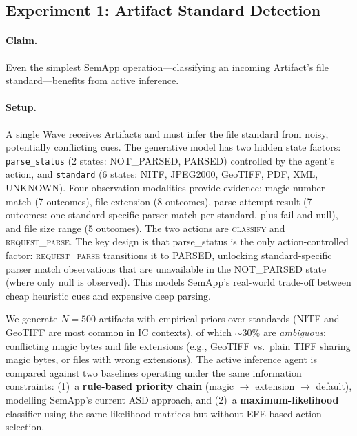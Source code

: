 \documentclass[11pt,a4paper]{article}
\theoremstyle{definition}
\begin{document}
\subsection{Experiment 1: Artifact Standard Detection}
\label{sec:exp1}

\paragraph{Claim.} Even the simplest SemApp operation---classifying an incoming Artifact's file standard---benefits from active inference.

\paragraph{Setup.} A single Wave receives Artifacts and must infer the file standard from noisy, potentially conflicting cues. The generative model has two hidden state factors: \texttt{parse\_status} (2 states: NOT\_PARSED, PARSED) controlled by the agent's action, and \texttt{standard} (6 states: NITF, JPEG2000, GeoTIFF, PDF, XML, UNKNOWN). Four observation modalities provide evidence: magic number match (7 outcomes), file extension (8 outcomes), parse attempt result (7 outcomes: one standard-specific parser match per standard, plus fail and null), and file size range (5 outcomes). The two actions are \textsc{classify} and \textsc{request\_parse}. The key design is that parse\_status is the only action-controlled factor: \textsc{request\_parse} transitions it to PARSED, unlocking standard-specific parser match observations that are unavailable in the NOT\_PARSED state (where only null is observed). This models SemApp's real-world trade-off between cheap heuristic cues and expensive deep parsing.

We generate $N = 500$ artifacts with empirical priors over standards (NITF and GeoTIFF are most common in IC contexts), of which $\sim 30\%$ are \emph{ambiguous}: conflicting magic bytes and file extensions (e.g., GeoTIFF vs.\ plain TIFF sharing magic bytes, or files with wrong extensions). The active inference agent is compared against two baselines operating under the same information constraints: (1)~a \textbf{rule-based priority chain} (magic $\to$ extension $\to$ default), modelling SemApp's current ASD approach, and (2)~a \textbf{maximum-likelihood} classifier using the same likelihood matrices but without EFE-based action selection.
\end{document}

